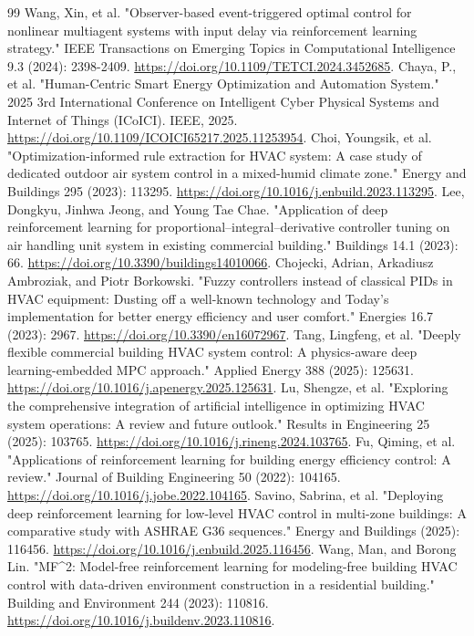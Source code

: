 ﻿\documentclass[preprint,12pt,number]{elsarticle}
\begin{document}
\begin{thebibliography}{99}
 Wang, Xin, et al. "Observer-based event-triggered optimal control for nonlinear multiagent systems with input delay via reinforcement learning strategy." IEEE Transactions on Emerging Topics in Computational Intelligence 9.3 (2024): 2398-2409. \url{https://doi.org/10.1109/TETCI.2024.3452685}.
 Chaya, P., et al. "Human-Centric Smart Energy Optimization and Automation System." 2025 3rd International Conference on Intelligent Cyber Physical Systems and Internet of Things (ICoICI). IEEE, 2025. \url{https://doi.org/10.1109/ICOICI65217.2025.11253954}.
 Choi, Youngsik, et al. "Optimization-informed rule extraction for HVAC system: A case study of dedicated outdoor air system control in a mixed-humid climate zone." Energy and Buildings 295 (2023): 113295. \url{https://doi.org/10.1016/j.enbuild.2023.113295}.
 Lee, Dongkyu, Jinhwa Jeong, and Young Tae Chae. "Application of deep reinforcement learning for proportional--integral--derivative controller tuning on air handling unit system in existing commercial building." Buildings 14.1 (2023): 66. \url{https://doi.org/10.3390/buildings14010066}.
 Chojecki, Adrian, Arkadiusz Ambroziak, and Piotr Borkowski. "Fuzzy controllers instead of classical PIDs in HVAC equipment: Dusting off a well-known technology and Today's implementation for better energy efficiency and user comfort." Energies 16.7 (2023): 2967. \url{https://doi.org/10.3390/en16072967}.
 Tang, Lingfeng, et al. "Deeply flexible commercial building HVAC system control: A physics-aware deep learning-embedded MPC approach." Applied Energy 388 (2025): 125631. \url{https://doi.org/10.1016/j.apenergy.2025.125631}.
 Lu, Shengze, et al. "Exploring the comprehensive integration of artificial intelligence in optimizing HVAC system operations: A review and future outlook." Results in Engineering 25 (2025): 103765. \url{https://doi.org/10.1016/j.rineng.2024.103765}.
 Fu, Qiming, et al. "Applications of reinforcement learning for building energy efficiency control: A review." Journal of Building Engineering 50 (2022): 104165. \url{https://doi.org/10.1016/j.jobe.2022.104165}.
 Savino, Sabrina, et al. "Deploying deep reinforcement learning for low-level HVAC control in multi-zone buildings: A comparative study with ASHRAE G36 sequences." Energy and Buildings (2025): 116456. \url{https://doi.org/10.1016/j.enbuild.2025.116456}.
 Wang, Man, and Borong Lin. "MF\textasciicircum{}2: Model-free reinforcement learning for modeling-free building HVAC control with data-driven environment construction in a residential building." Building and Environment 244 (2023): 110816. \url{https://doi.org/10.1016/j.buildenv.2023.110816}.

\end{thebibliography}
\end{document}
